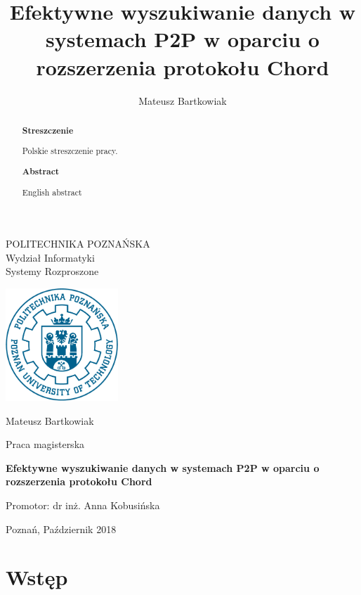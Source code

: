 \documentclass[12pt, twoside, openany]{report}
\author{Mateusz Bartkowiak}
\title{Efektywne wyszukiwanie danych w systemach P2P w oparciu o rozszerzenia protokołu Chord}
\begin{document}
\begin{titlepage}

\noindent


\centering
\Large POLITECHNIKA POZNAŃSKA\\
\Large Wydział Informatyki\\
\large Systemy Rozproszone

\vfill
\includegraphics[width=120pt,height=120pt]{PP}

\vfill
\center
\LARGE
Mateusz Bartkowiak

\center
\Large
Praca magisterska

\vfill
\center
\Huge
\textbf{Efektywne wyszukiwanie danych w systemach P2P w oparciu o rozszerzenia protokołu Chord}


\vfill
\center
\Large
Promotor: dr inż. Anna Kobusińska

\vfill
\center
\large
Poznań, Październik 2018

\end{titlepage}

\renewcommand{\abstractname}{}
\begin{abstract}
\thispagestyle{plain} %
\begin{center}
\textbf{Streszczenie}
\end{center}

\indent
Polskie streszczenie pracy.

\vspace{50px}
\begin{center}
\textbf{Abstract}
\end{center}

\indent
English abstract

\end{abstract}


\tableofcontents



\chapter{Wstęp}
\end{document}
